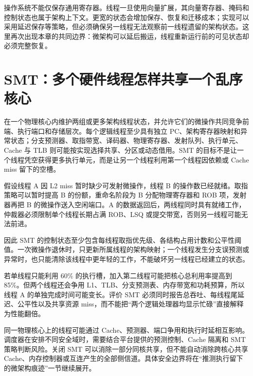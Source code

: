 操作系统不能仅保存通用寄存器。线程一旦使用向量扩展，其向量寄存器、掩码和控制状态也属于架构上下文。更宽的状态会增加保存、恢复和迁移成本；实现可以采用延迟保存等策略，但必须确保另一线程无法观察前一线程遗留的架构状态。这里再次出现本章的共同边界：微架构可以延后搬运，线程重新运行前的可见状态却必须完整恢复。

\section{SMT：多个硬件线程怎样共享一个乱序核心}

 在一个物理核心内维护两组或更多架构线程状态，并允许它们的微操作共同竞争前端、执行端口和存储层次。每个逻辑线程至少具有独立 PC、架构寄存器映射和异常状态；分支预测器、取指带宽、译码器、物理寄存器、发射队列、执行单元、Cache 与 TLB 则可能按实现选择共享、分区或动态借用。SMT 的目标不是让一个线程凭空获得更多执行单元，而是让另一个线程利用第一个线程因依赖或 Cache miss 留下的空槽。\cite{arm-smt}

假设线程 A 因 L2 miss 暂时缺少可发射微操作，线程 B 的操作数已经就绪。取指策略可以暂时提高 B 的份额，重命名阶段为 B 分配物理寄存器和 ROB 项，发射器再把 B 的微操作送入空闲端口。A 的数据返回后，两线程同时具有就绪工作，仲裁器必须限制单个线程长期占满 ROB、LSQ 或提交带宽，否则另一线程可能无法前进。

因此 SMT 的控制状态至少包含每线程取指优先级、各结构占用计数和公平性阈值。一次微操作退休时，只更新所属线程的架构映射；一个线程发生分支误预测或异常时，也只能清除该线程中更年轻的工作，不能破坏另一线程已经建立的状态。

若单线程只能利用 60\% 的执行槽，加入第二线程可能把核心总利用率提高到 85\%。但两个线程还会争用 L1、TLB、分支预测表、内存带宽和功耗预算，所以线程 A 的单独完成时间可能变长。评价 SMT 必须同时报告总吞吐、每线程尾延迟、公平性以及共享资源 miss，而不能把“两个逻辑处理器均显示忙碌”直接解释为性能翻倍。

同一物理核心上的线程可能通过 Cache、预测器、端口争用和执行时延相互影响。调度器在安排不同安全域时，需要结合平台提供的预测控制、Cache 隔离和 SMT 策略判断风险。关闭 SMT 可以消除一部分同核共享，但不能自动消除跨核心共享 Cache、内存控制器或互连产生的全部侧信道。具体安全边界将在“推测执行留下的微架构痕迹”一节继续展开。
